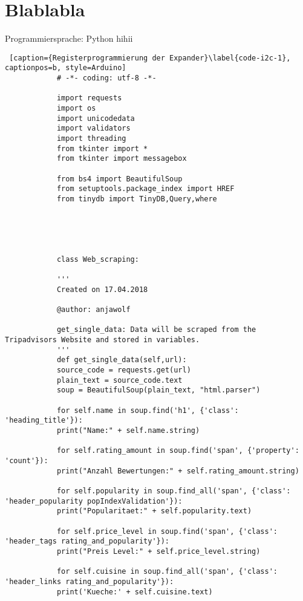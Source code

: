 \documentclass[a4paper,oneside,12pt]{report}
\begin{document}
	


	\newpage
	\tableofcontents
	
	
	
	
	
	\chapter{Blablabla}\label{bla}
		
		Programmiersprache: Python
		hihii
				
			\begin{lstlisting} [caption={Registerprogrammierung der Expander}\label{code-i2c-1}, captionpos=b, style=Arduino]
			# -*- coding: utf-8 -*-
			
			import requests
			import os
			import unicodedata
			import validators
			import threading
			from tkinter import *
			from tkinter import messagebox
			
			from bs4 import BeautifulSoup
			from setuptools.package_index import HREF
			from tinydb import TinyDB,Query,where
			
			
			
			
			
			class Web_scraping:
			
			'''
			Created on 17.04.2018
			
			@author: anjawolf
			
			get_single_data: Data will be scraped from the Tripadvisors Website and stored in variables.
			'''
			def get_single_data(self,url):
			source_code = requests.get(url)
			plain_text = source_code.text
			soup = BeautifulSoup(plain_text, "html.parser")
			
			for self.name in soup.find('h1', {'class': 'heading_title'}):
			print("Name:" + self.name.string)
			
			for self.rating_amount in soup.find('span', {'property': 'count'}):
			print("Anzahl Bewertungen:" + self.rating_amount.string)
			
			for self.popularity in soup.find_all('span', {'class': 'header_popularity popIndexValidation'}):
			print("Popularitaet:" + self.popularity.text)
			
			for self.price_level in soup.find('span', {'class': 'header_tags rating_and_popularity'}):
			print("Preis Level:" + self.price_level.string)
			
			for self.cuisine in soup.find_all('span', {'class': 'header_links rating_and_popularity'}):
			print('Kueche:' + self.cuisine.text)
			

\end{lstlisting}
\end{document}
